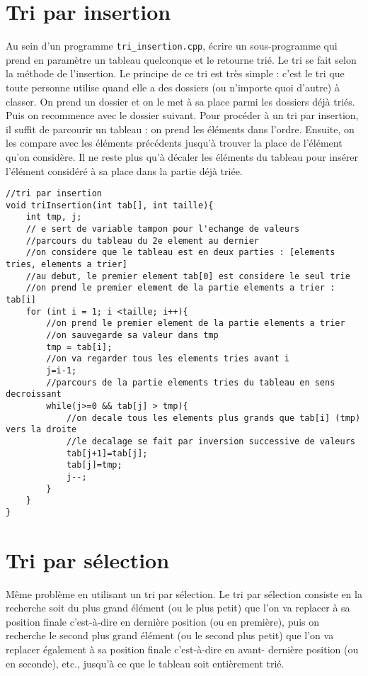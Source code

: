 \documentclass[french]{article}
\begin{document}
\section{Tri par insertion}
Au sein d’un programme \texttt{tri\_insertion.cpp}, écrire un sous-programme qui prend en paramètre un tableau quelconque et le retourne trié. Le tri se fait selon la méthode de l’insertion. Le principe de ce tri est très simple : c'est le tri que toute personne utilise quand elle a des dossiers (ou n'importe quoi d'autre) à classer. On prend un dossier et on le met à sa place parmi les dossiers déjà triés. Puis on recommence avec le dossier suivant. Pour procéder à un tri par insertion, il suffit de parcourir un tableau : on prend les éléments dans l'ordre. Ensuite, on les compare avec les éléments précédents jusqu'à trouver la place de l'élément qu'on considère. Il ne reste plus qu'à décaler les éléments du tableau pour insérer l'élément considéré à sa place dans la partie déjà triée.

	\begin{lstlisting}[caption={Tri par insertion}]
//tri par insertion
void triInsertion(int tab[], int taille){
    int tmp, j;
    // e sert de variable tampon pour l'echange de valeurs
    //parcours du tableau du 2e element au dernier
    //on considere que le tableau est en deux parties : [elements tries, elements a trier]
    //au debut, le premier element tab[0] est considere le seul trie
    //on prend le premier element de la partie elements a trier : tab[i]
    for (int i = 1; i <taille; i++){
        //on prend le premier element de la partie elements a trier
        //on sauvegarde sa valeur dans tmp
        tmp = tab[i];
        //on va regarder tous les elements tries avant i
        j=i-1;
        //parcours de la partie elements tries du tableau en sens decroissant
        while(j>=0 && tab[j] > tmp){
            //on decale tous les elements plus grands que tab[i] (tmp) vers la droite
            //le decalage se fait par inversion successive de valeurs
            tab[j+1]=tab[j];
            tab[j]=tmp;
            j--;
        }
    }
}
	\end{lstlisting}
\section{Tri par sélection}
Même problème en utilisant un tri par sélection. Le tri par sélection consiste en la recherche soit du plus grand élément (ou le plus petit) que l'on va replacer à sa position finale c'est-à-dire en dernière position (ou en première), puis on recherche le second plus grand élément (ou le second plus petit) que l'on va replacer également à sa position finale c'est-à-dire en avant- dernière position (ou en seconde), etc., jusqu'à ce que le tableau soit entièrement trié.
\end{document}

